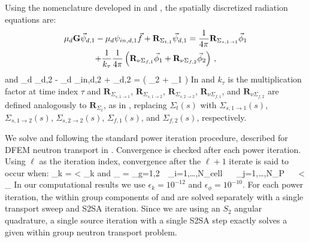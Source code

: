 Using the nomenclature developed in  and , the spatially discretized radiation equations are:
\begin{multline}
\mu_d \mathbf{G} \vec{\psi}_{d,1} - \mu_d \psi_{in,d,1} \vec{f} + \mathbf{R}_{\Sigma_{t,1}} \vec{\psi}_{d,1} = 
\frac{1}{4\pi}\mathbf{R}_{\Sigma_{s,1\to1}}\vec{\phi}_1  \\
+ \frac{1}{k_{\tau}} \frac{1}{4\pi}\left( \mathbf{R}_{\nu\Sigma_{f,1}} \vec{\phi}_1 +\mathbf{R}_{\nu\Sigma_{f,2}} \vec{\phi}_2 \right)\, , 
\label{eq:fast_DFEM}
\end{multline}
%
and
%
\benum
\mu_d  \vec{\psi}_{d,2} - \mu_d \psi_{in,d,2}  +  \vec{\psi}_{d,2} = 
\left( \vec{\phi}_2  +
\vec{\phi}_1 \right) \pep
\label{eq:thermal_DFEM}
\eenum
In  and  $k_{\tau}$ is the multiplication factor at time index $\tau$ and $\mathbf{R}_{\Sigma_{s,1\to1}}$, $\mathbf{R}_{\Sigma_{s,1\to2}}$, $\mathbf{R}_{\Sigma_{s,2\to2}}$, $\mathbf{R}_{\nu\Sigma_{f,1}}$, and $\mathbf{R}_{\nu\Sigma_{f,2}}$ are defined analogously to $\mathbf{R}_{\Sigma_t}$, as in , replacing $\Sigma_t(s)$ with $\Sigma_{s,1\to1}(s)$, $\Sigma_{s,1\to2}(s)$, $\Sigma_{s,2\to2}(s)$, $\Sigma_{f,1}(s)$, and $\Sigma_{f,2}(s)$, respectively.

We solve  and  following the standard power iteration procedure, described for DFEM neutron transport in 
\cite{warsa_k}.  
Convergence is checked after each power iteration.  
Using $\ell$ as the iteration index, convergence after the $\ell + 1$ iterate is said to occur when:
\benum
\delta_k =  < \epsilon_k \pec
\eenum
and
\benum
\delta_{\phi} = \max_{g=1,2}~~\max_{i=1,\dots,N_{cell}} ~~ \max_{j=1,\dots,N_P} ~~  < \epsilon_{\phi} \pep
\eenum
In our computational results we use $\epsilon_k = 10^{-12}$ and $\epsilon_{\phi} = 10^{-10}$.
For each power iteration, the within group components of  and  are solved separately with a single transport sweep and S2SA iteration.
Since we are using an $S_2$ angular quadrature, a single source iteration with a single S2SA step exactly solves a given within group neutron transport problem.


